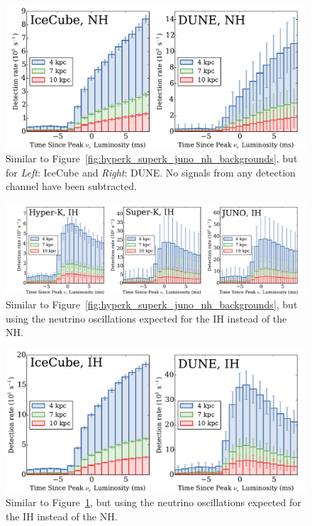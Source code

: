 \begin{figure}[h]
\centerline{\includegraphics[width=.8\linewidth]{backgrounds_histogram_groupingnumber_1_NH.pdf}}
\caption{\label{fig:icecube_dune_nh_backgrounds} Similar to
  Figure~\ref{fig:hyperk_superk_juno_nh_backgrounds}, but for {\it Left}:
  IceCube and {\it Right}: DUNE. No signals from any detection channel
  have been subtracted.
}
\end{figure}

\clearpage

\begin{figure}[h]
\centerline{\includegraphics[width=\linewidth]{backgrounds_histogram_groupingnumber_0_IH.pdf}}
\caption{\label{fig:hyperk_superk_juno_ih_backgrounds} Similar to 
  Figure~\ref{fig:hyperk_superk_juno_nh_backgrounds}, but using the neutrino
  oscillations expected for the IH instead of the NH.
}
\end{figure}


\begin{figure}[h]
\centerline{\includegraphics[width=.8\linewidth]{backgrounds_histogram_groupingnumber_1_IH.pdf}}
\caption{\label{fig:icecube_dune_ih_backgrounds} Similar to
  Figure~\ref{fig:icecube_dune_nh_backgrounds}, but using the neutrino
  oscillations expected for the IH instead of the NH.
}
\end{figure}


